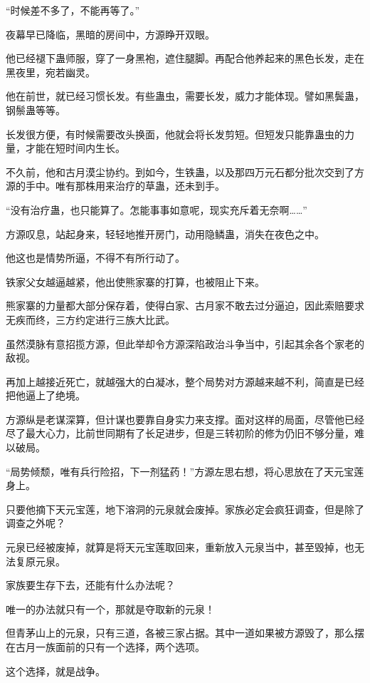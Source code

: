 
\begin{this_body}

“时候差不多了，不能再等了。”

夜幕早已降临，黑暗的房间中，方源睁开双眼。

他已经褪下蛊师服，穿了一身黑袍，遮住腿脚。再配合他养起来的黑色长发，走在黑夜里，宛若幽灵。

他在前世，就已经习惯长发。有些蛊虫，需要长发，威力才能体现。譬如黑鬓蛊，钢鬃蛊等等。

长发很方便，有时候需要改头换面，他就会将长发剪短。但短发只能靠蛊虫的力量，才能在短时间内生长。

不久前，他和古月漠尘协约。到如今，生铁蛊，以及那四万元石都分批次交到了方源的手中。唯有那株用来治疗的草蛊，还未到手。

“没有治疗蛊，也只能算了。怎能事事如意呢，现实充斥着无奈啊……”

方源叹息，站起身来，轻轻地推开房门，动用隐鳞蛊，消失在夜色之中。

他这也是情势所逼，不得不有所行动了。

铁家父女越逼越紧，他出使熊家寨的打算，也被阻止下来。

熊家寨的力量都大部分保存着，使得白家、古月家不敢去过分逼迫，因此索赔要求无疾而终，三方约定进行三族大比武。

虽然漠脉有意招揽方源，但此举却令方源深陷政治斗争当中，引起其余各个家老的敌视。

再加上越接近死亡，就越强大的白凝冰，整个局势对方源越来越不利，简直是已经把他逼上了绝境。

方源纵是老谋深算，但计谋也要靠自身实力来支撑。面对这样的局面，尽管他已经尽了最大心力，比前世同期有了长足进步，但是三转初阶的修为仍旧不够分量，难以破局。

“局势倾颓，唯有兵行险招，下一剂猛药！”方源左思右想，将心思放在了天元宝莲身上。

只要他摘下天元宝莲，地下溶洞的元泉就会废掉。家族必定会疯狂调查，但是除了调查之外呢？

元泉已经被废掉，就算是将天元宝莲取回来，重新放入元泉当中，甚至毁掉，也无法复原元泉。

家族要生存下去，还能有什么办法呢？

唯一的办法就只有一个，那就是夺取新的元泉！

但青茅山上的元泉，只有三道，各被三家占据。其中一道如果被方源毁了，那么摆在古月一族面前的只有一个选择，两个选项。

这个选择，就是战争。


\end{this_body}
